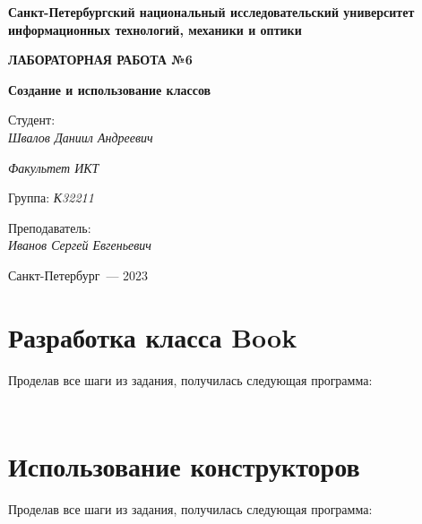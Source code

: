 \documentclass[a4paper,14pt]{extarticle}
\numberwithin{figure}{section}
\begin{document}
\begin{titlepage}
    \vspace{0pt plus2fill}
    \noindent

    \vspace{0pt plus6fill}
    \begin{center}
        \textbf{\large{Санкт-Петербургский национальный исследовательский университет информационных
                технологий, механики и оптики}}

        \vspace{0pt plus2fill}
        \textbf{\Large{ЛАБОРАТОРНАЯ РАБОТА №6}}

        \vspace{0pt plus2fill}
        \textbf{\large{Создание и использование классов}}
    \end{center}

    \vspace{0pt plus8fill}
    \begin{flushright}
        Студент: \\
        \textit{Швалов Даниил Андреевич}

        \textit{Факультет ИКТ}

        Группа: \textit{К32211}

        Преподаватель: \\
        \textit{Иванов Сергей Евгеньевич}
    \end{flushright}

    \vspace{0pt plus4fill}
    \begin{center}
        {Санкт-Петербург~--- 2023}
    \end{center}
\end{titlepage}

\section{Разработка класса Book}

Проделав все шаги из задания, получилась следующая программа:

\inputminted{csharp}{../MyClass/MyClass/Book.cs}

\inputminted{csharp}{../MyClass/MyClass/Program.cs}

\section{Использование конструкторов}

Проделав все шаги из задания, получилась следующая программа:
\end{document}
